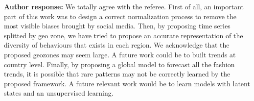 \documentclass[10pt]{article} %
\begin{document}
\begin{itemize}
	\textbf{Author response:} We totally agree with the referee. First of all, an important part of this work was to design a correct normalization process to remove the most visible biases brought by social media. Then, by proposing time series splitted by geo zone, we have tried to propose an accurate representation of the diversity of behaviours that exists in each region. We acknowledge that the proposed geozones may seem large. A future work could be to built trends at country level. Finally, by proposing a global model to forecast all the fashion trends, it is possible that rare patterns may not be correctly learned by the proposed framework. A future relevant work would be to learn models with latent states and an unsupervised learning.	
\end{itemize}



\end{document}
